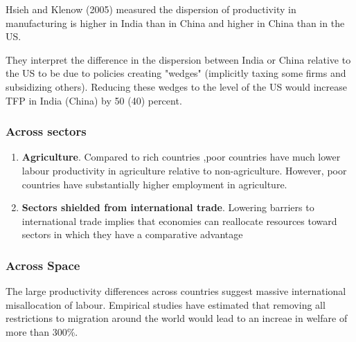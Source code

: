 \documentclass[11pt]{article}
\begin{document}
Hsieh and Klenow (2005) \cite{hsieh2009} measured the dispersion of productivity in manufacturing is higher in India than in China and higher in China than in the US.

They interpret the difference in the dispersion between India or China relative to the US to be due to policies creating "wedges" (implicitly taxing some firms and subsidizing others). Reducing these wedges to the level of the US would increase TFP in India (China) by 50 (40) percent.

\subsubsection{Across sectors}

\begin{enumerate}
    \item \textbf{Agriculture}. Compared to rich countries ,poor countries have much lower labour productivity in agriculture relative to non-agriculture. However, poor countries have substantially higher employment in agriculture.

    \item \textbf{Sectors shielded from international trade}. Lowering barriers to international trade implies that economies can reallocate resources toward sectors in which they have a comparative advantage
\end{enumerate}

\subsubsection{Across Space}

The large productivity differences across countries suggest massive international misallocation of labour. Empirical studies have estimated that removing all restrictions to migration around the world would lead to an increae in welfare of more than 300\%.
\end{document}
